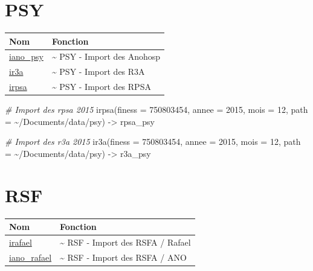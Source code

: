 \documentclass[
]{book}
\newenvironment{Shaded}{\begin{snugshade}}{\end{snugshade}}
\newcommand{\AttributeTok}[1]{\textcolor[rgb]{0.77,0.63,0.00}{#1}}
\newcommand{\CommentTok}[1]{\textcolor[rgb]{0.56,0.35,0.01}{\textit{#1}}}
\newcommand{\DecValTok}[1]{\textcolor[rgb]{0.00,0.00,0.81}{#1}}
\newcommand{\FunctionTok}[1]{\textcolor[rgb]{0.00,0.00,0.00}{#1}}
\newcommand{\NormalTok}[1]{#1}
\newcommand{\OtherTok}[1]{\textcolor[rgb]{0.56,0.35,0.01}{#1}}
\newcommand{\StringTok}[1]{\textcolor[rgb]{0.31,0.60,0.02}{#1}}
\begin{document}
\hypertarget{psy}{%
\section{PSY}\label{psy}}

\begin{longtable}[]{@{}ll@{}}
\toprule
Nom & Fonction \\
\midrule
\endhead
\href{https://guillaumepressiat.github.io/pmeasyr/reference/iano_psy.html}{iano\_psy} & \textasciitilde{} PSY - Import des Anohosp \\
\href{https://guillaumepressiat.github.io/pmeasyr/reference/ir3a.html}{ir3a} & \textasciitilde{} PSY - Import des R3A \\
\href{https://guillaumepressiat.github.io/pmeasyr/reference/irpsa.html}{irpsa} & \textasciitilde{} PSY - Import des RPSA \\
\bottomrule
\end{longtable}

\begin{Shaded}
\begin{Highlighting}[]
\CommentTok{\# Import des rpsa 2015}
\FunctionTok{irpsa}\NormalTok{(}\AttributeTok{finess =} \DecValTok{750803454}\NormalTok{,}
      \AttributeTok{annee =} \DecValTok{2015}\NormalTok{,}
      \AttributeTok{mois =} \DecValTok{12}\NormalTok{,}
      \AttributeTok{path =} \StringTok{\textquotesingle{}\textasciitilde{}/Documents/data/psy\textquotesingle{}}\NormalTok{) }\OtherTok{{-}\textgreater{}}\NormalTok{ rpsa\_psy}

\CommentTok{\# Import des r3a 2015}
\FunctionTok{ir3a}\NormalTok{(}\AttributeTok{finess =} \DecValTok{750803454}\NormalTok{,}
      \AttributeTok{annee =} \DecValTok{2015}\NormalTok{,}
      \AttributeTok{mois =} \DecValTok{12}\NormalTok{,}
      \AttributeTok{path =} \StringTok{\textquotesingle{}\textasciitilde{}/Documents/data/psy\textquotesingle{}}\NormalTok{) }\OtherTok{{-}\textgreater{}}\NormalTok{ r3a\_psy}
\end{Highlighting}
\end{Shaded}

\hypertarget{rsf}{%
\section{RSF}\label{rsf}}

\begin{longtable}[]{@{}ll@{}}
\toprule
Nom & Fonction \\
\midrule
\endhead
\href{https://guillaumepressiat.github.io/pmeasyr/reference/irafael.html}{irafael} & \textasciitilde{} RSF - Import des RSFA / Rafael \\
\href{https://guillaumepressiat.github.io/pmeasyr/reference/iano_rafael.html}{iano\_rafael} & \textasciitilde{} RSF - Import des RSFA / ANO \\
\bottomrule
\end{longtable}
\end{document}
